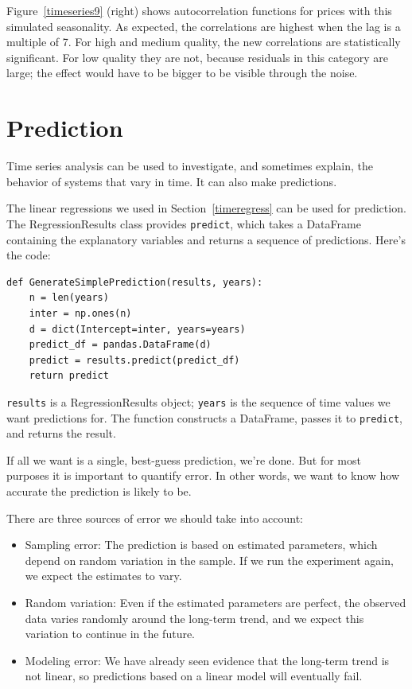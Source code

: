 \documentclass[12pt]{book}
\begin{document}
Figure~\ref{timeseries9} (right) shows autocorrelation functions for
prices with this simulated seasonality.  As expected, the
correlations are highest when the lag is a multiple of 7.  For
high and medium quality, the new correlations are statistically
significant.  For low quality they are not, because residuals in this
category are large; the effect would have to be bigger
to be visible through the noise.
   


\section{Prediction}  

Time series analysis can be used to investigate, and sometimes
explain, the behavior of systems that vary in time.  It can also
make predictions.

The linear regressions we used in Section~\ref{timeregress} can be
used for prediction.  The RegressionResults class provides \verb"predict",
which takes a DataFrame containing the explanatory
variables and returns a sequence of predictions.  Here's the code:

\begin{verbatim}
def GenerateSimplePrediction(results, years):
    n = len(years)
    inter = np.ones(n)
    d = dict(Intercept=inter, years=years)
    predict_df = pandas.DataFrame(d)
    predict = results.predict(predict_df)
    return predict
\end{verbatim}

\verb"results" is a RegressionResults object; \verb"years" is the
sequence of time values we want predictions for.  The function
constructs a DataFrame, passes it to \verb"predict", and
returns the result.

If all we want is a single, best-guess prediction, we're done.  But
for most purposes it is important to quantify error.  In other words,
we want to know how accurate the prediction is likely to be.

There are three sources of error we should take into account:

\begin{itemize}

\item Sampling error: The prediction is based on estimated
parameters, which depend on random variation
in the sample.  If we run the experiment again, we expect
the estimates to vary.

\item Random variation:  Even if the estimated parameters are
perfect, the observed data varies randomly around the long-term
trend, and we expect this variation to continue in the future.

\item Modeling error: We have already seen evidence that the long-term
trend is not linear, so predictions based on a linear model will
eventually fail.  

\end{itemize}
\end{document}

